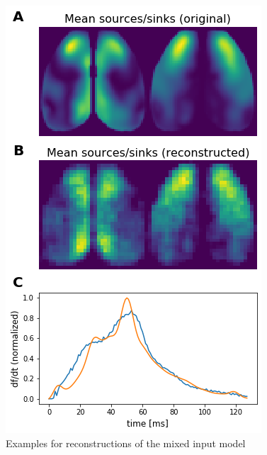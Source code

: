 \begin{figure}[!htb]
\centering
\includegraphics[width=\textwidth,height=\textheight,keepaspectratio]{Figures/reconstructions_example_mixed_input}
\decoRule
\caption[Examples for reconstructions of the mixed input model]{Examples for reconstructions of the mixed input model}
\label{fig:reconstructions_example_mixed_input}
\end{figure}

